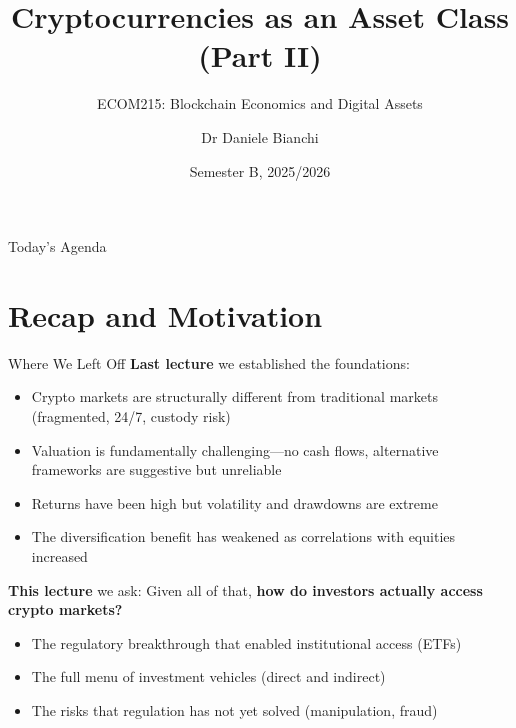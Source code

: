 \documentclass[10pt]{beamer}
\title{Cryptocurrencies as an Asset Class (Part II)}
\subtitle{ECOM215: Blockchain Economics and Digital Assets}
\author{Dr Daniele Bianchi}
\institute{Queen Mary, University of London}
\date{Semester B, 2025/2026}
\newcommand{\highlight}[1]{\textcolor{AccentOrange}{\textbf{#1}}}
\begin{document}
\AtBeginSection[]{
  \begin{frame}[plain]
    \vfill
    \begin{center}
      {\Large\color{ImperialBlue}\insertsection}
    \end{center}
    \vfill
  \end{frame}
}

\begin{frame}[plain]
  \titlepage
\end{frame}

\begin{frame}{Today's Agenda}
  \tableofcontents
\end{frame}

\section{Recap and Motivation}

\begin{frame}{Where We Left Off}
  \textbf{Last lecture} we established the foundations:
  \begin{itemize}
    \item Crypto markets are structurally different from traditional markets (fragmented, 24/7, custody risk)
    \item Valuation is fundamentally challenging---no cash flows, alternative frameworks are suggestive but unreliable
    \item Returns have been high but volatility and drawdowns are extreme
    \item The diversification benefit has weakened as correlations with equities increased
  \end{itemize}
  
  \vspace{1em}
  \textbf{This lecture} we ask: Given all of that, \highlight{how do investors actually access crypto markets?}
  
  \vspace{0.5em}
  \begin{itemize}
    \item The regulatory breakthrough that enabled institutional access (ETFs)
    \item The full menu of investment vehicles (direct and indirect)
    \item The risks that regulation has not yet solved (manipulation, fraud)
  \end{itemize}
\end{frame}
\end{document}
